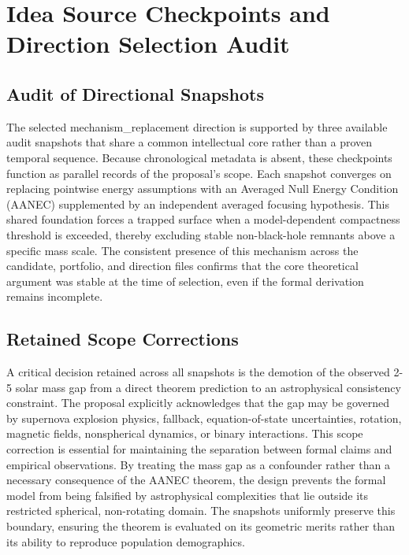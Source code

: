 \documentclass[conference]{IEEEtran}
\begin{document}
\appendices
\section{Idea Source Checkpoints and Direction Selection Audit}
\subsection{Audit of Directional Snapshots}
The selected mechanism\_replacement direction is supported by three available audit snapshots that share a common intellectual core rather than a proven temporal sequence. Because chronological metadata is absent, these checkpoints function as parallel records of the proposal’s scope. Each snapshot converges on replacing pointwise energy assumptions with an Averaged Null Energy Condition (AANEC) supplemented by an independent averaged focusing hypothesis. This shared foundation forces a trapped surface when a model-dependent compactness threshold is exceeded, thereby excluding stable non-black-hole remnants above a specific mass scale. The consistent presence of this mechanism across the candidate, portfolio, and direction files confirms that the core theoretical argument was stable at the time of selection, even if the formal derivation remains incomplete.~\cite{cite_0ed84243cf171bc4}

\subsection{Retained Scope Corrections}
A critical decision retained across all snapshots is the demotion of the observed 2-5 solar mass gap from a direct theorem prediction to an astrophysical consistency constraint. The proposal explicitly acknowledges that the gap may be governed by supernova explosion physics, fallback, equation-of-state uncertainties, rotation, magnetic fields, nonspherical dynamics, or binary interactions. This scope correction is essential for maintaining the separation between formal claims and empirical observations. By treating the mass gap as a confounder rather than a necessary consequence of the AANEC theorem, the design prevents the formal model from being falsified by astrophysical complexities that lie outside its restricted spherical, non-rotating domain. The snapshots uniformly preserve this boundary, ensuring the theorem is evaluated on its geometric merits rather than its ability to reproduce population demographics.~\cite{cite_7a407c865faafd11,cite_f634820e22d7a238}
\end{document}
